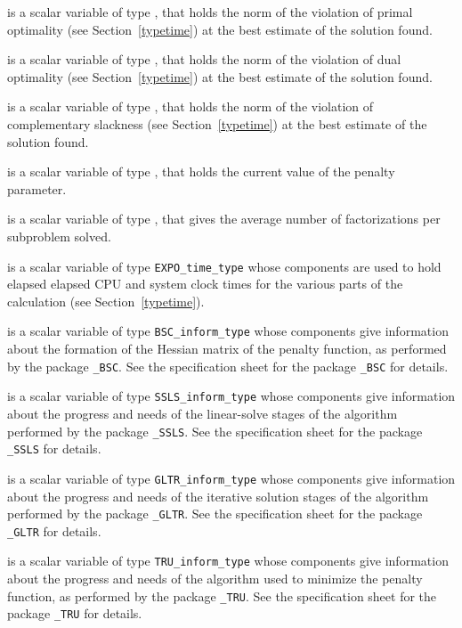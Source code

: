 \documentclass{galahad}
\newcommand{\packagename}{EXPO}
\begin{document}
\begin{description}
 is a scalar variable of type \realdp,
that holds the norm of the violation of primal optimality
(see Section~\ref{typetime}) at the best estimate of the solution found.

 is a scalar variable of type \realdp,
that holds the norm of the violation of dual optimality
(see Section~\ref{typetime}) at the best estimate of the solution found.

is a scalar variable of type \realdp,
that holds the norm of the violation of complementary slackness
(see Section~\ref{typetime}) at the best estimate of the solution found.

 is a scalar variable of type \realdp, that holds
the current value of the penalty parameter.

 is a scalar variable of type \realdp, that
gives the average number of factorizations per subproblem solved.

 is a scalar variable of type {\tt \packagename\_time\_type}
whose components are used to hold elapsed elapsed CPU and system clock
times for the various parts of the calculation (see Section~\ref{typetime}).

 is a scalar variable of type
{\tt BSC\_inform\_type}
whose components give information about the formation of the Hessian matrix
of the penalty function, as performed by the package
{\tt \libraryname\_BSC}.
See the specification sheet for the package
{\tt \libraryname\_BSC}
for details.

 is a scalar variable of type
{\tt SSLS\_inform\_type}
whose components give information about the progress and needs
of the linear-solve stages of the algorithm performed by the package
{\tt \libraryname\_SSLS}.
See the specification sheet for the package
{\tt \libraryname\_SSLS}
for details.

 is a scalar variable of type
{\tt GLTR\_inform\_type}
whose components give information about the progress and needs
of the iterative solution stages of the algorithm performed by the package
{\tt \libraryname\_GLTR}.
See the specification sheet for the package
{\tt \libraryname\_GLTR}
for details.

 is a scalar variable of type
{\tt TRU\_inform\_type}
whose components give information about the progress and needs
of the algorithm used to minimize the penalty function, as performed
by the package
{\tt \libraryname\_TRU}.
See the specification sheet for the package
{\tt \libraryname\_TRU}
for details.

\end{description}
\end{document}
